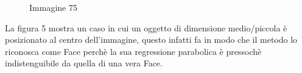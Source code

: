 \documentclass[
  italian,
]{article}
\begin{document}
\begin{figure}
\centering
{}%
\qquad
{}%
\qquad
{}%
\caption{Immagine 75}
\end{figure}
La figura 5 mostra un caso in cui un oggetto di dimensione medio/piccola è posizionato al centro dell'immagine, questo infatti fa in modo che il metodo lo riconosca come Face perchè la sua regressione parabolica è pressochè indistenguibile da quella di una vera Face.
\end{document}
